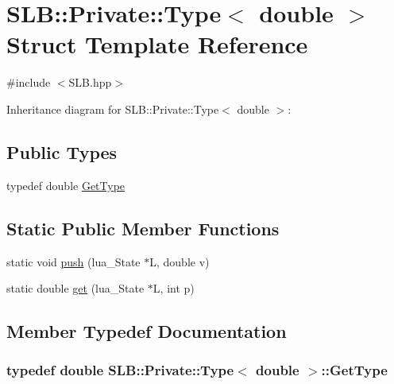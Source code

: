 \hypertarget{structSLB_1_1Private_1_1Type_3_01double_01_4}{}\section{S\+LB\+:\+:Private\+:\+:Type$<$ double $>$ Struct Template Reference}
\label{structSLB_1_1Private_1_1Type_3_01double_01_4}


{\ttfamily \#include $<$S\+L\+B.\+hpp$>$}



Inheritance diagram for S\+LB\+:\+:Private\+:\+:Type$<$ double $>$\+:
\subsection*{Public Types}
\begin{DoxyCompactItemize}
\item 
typedef double \hyperlink{structSLB_1_1Private_1_1Type_3_01double_01_4_a02db5a6c475e3d5801ec7d6e7bd0f274}{Get\+Type}
\end{DoxyCompactItemize}
\subsection*{Static Public Member Functions}
\begin{DoxyCompactItemize}
\item 
static void \hyperlink{structSLB_1_1Private_1_1Type_3_01double_01_4_ad711914340b28cf753500fe17c21efb4}{push} (lua\+\_\+\+State $\ast$L, double v)
\item 
static double \hyperlink{structSLB_1_1Private_1_1Type_3_01double_01_4_a75a6acef6f983cf17ac256c551d527d2}{get} (lua\+\_\+\+State $\ast$L, int p)
\end{DoxyCompactItemize}


\subsection{Member Typedef Documentation}
\subsubsection[{\texorpdfstring{Get\+Type}{GetType}}]{\setlength{\rightskip}{0pt plus 5cm}typedef double {\bf S\+L\+B\+::\+Private\+::\+Type}$<$ double $>$\+::{\bf Get\+Type}}\hypertarget{structSLB_1_1Private_1_1Type_3_01double_01_4_a02db5a6c475e3d5801ec7d6e7bd0f274}{}\label{structSLB_1_1Private_1_1Type_3_01double_01_4_a02db5a6c475e3d5801ec7d6e7bd0f274}


